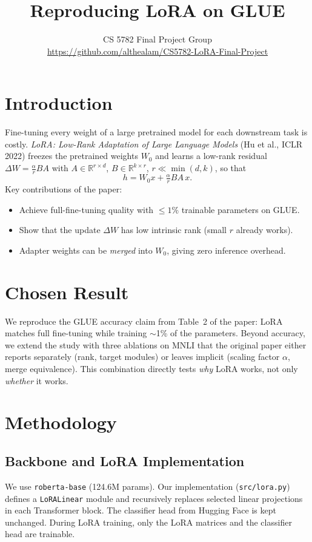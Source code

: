 \documentclass[11pt]{article}
\title{\vspace{-2em}\textbf{Reproducing LoRA on GLUE}}
\author{CS 5782 Final Project Group\\\small\url{https://github.com/althealam/CS5782-LoRA-Final-Project}}
\date{\vspace{-1em}}
\begin{document}
\maketitle
\vspace{-1.5em}

\section{Introduction}
Fine-tuning every weight of a large pretrained model for each downstream task is costly. \textit{LoRA: Low-Rank Adaptation of Large Language Models} (Hu et al., ICLR 2022) \cite{hu2022lora} freezes the pretrained weights $W_0$ and learns a low-rank residual $\Delta W = \tfrac{\alpha}{r}BA$ with $A \in \mathbb{R}^{r\times d}$, $B \in \mathbb{R}^{k\times r}$, $r \ll \min(d,k)$, so that
\[
h = W_0 x + \tfrac{\alpha}{r} BA\, x.
\]
Key contributions of the paper:
\begin{itemize}\setlength\itemsep{0pt}
  \item Achieve full-fine-tuning quality with $\le 1\%$ trainable parameters on GLUE.
  \item Show that the update $\Delta W$ has low intrinsic rank (small $r$ already works).
  \item Adapter weights can be \emph{merged} into $W_0$, giving zero inference overhead.
\end{itemize}

\section{Chosen Result}
We reproduce the GLUE accuracy claim from Table~2 of the paper: LoRA matches full fine-tuning while training $\sim$1\% of the parameters. Beyond accuracy, we extend the study with three ablations on MNLI that the original paper either reports separately (rank, target modules) or leaves implicit (scaling factor $\alpha$, merge equivalence). This combination directly tests \emph{why} LoRA works, not only \emph{whether} it works.

\section{Methodology}

\subsection{Backbone and LoRA Implementation}
We use \texttt{roberta-base} (124.6M params). Our implementation (\texttt{src/lora.py}) defines a \texttt{LoRALinear} module and recursively replaces selected linear projections in each Transformer block. The classifier head from Hugging Face is kept unchanged. During LoRA training, only the LoRA matrices and the classifier head are trainable.
\end{document}
